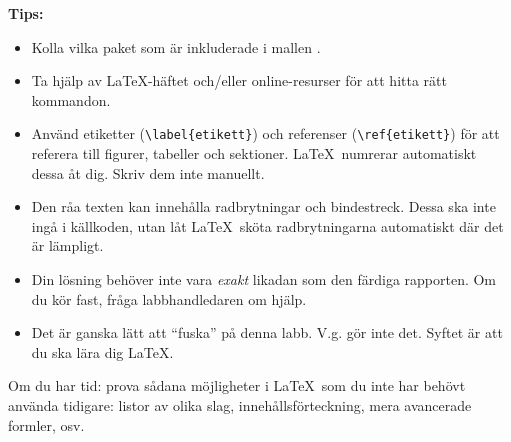 \begin{Datorarbete}
    \noindent\textbf{Tips:}
    \begin{itemize}
        \item Kolla vilka paket som är inkluderade i mallen .
        \item Ta hjälp av \LaTeX-häftet och/eller online-resurser för att hitta rätt kommandon.
        \item Använd etiketter (\verb/\label{etikett}/) och referenser (\verb/\ref{etikett}/) för att referera till figurer, tabeller och sektioner. \LaTeX\ numrerar automatiskt dessa åt dig. Skriv dem inte manuellt.
        \item Den råa texten kan innehålla radbrytningar och bindestreck. Dessa ska inte ingå i källkoden, utan låt \LaTeX\ sköta radbrytningarna automatiskt där det är lämpligt.
        \item Din lösning behöver inte vara \emph{exakt} likadan som den färdiga rapporten. Om du kör fast, fråga labbhandledaren om hjälp.
        \item Det är ganska lätt att \enquote{fuska} på denna labb. V.g. gör inte det. Syftet är att du ska lära dig \LaTeX.
    \end{itemize}

	\item Om du har tid: prova sådana möjligheter i \LaTeX\ som du inte har behövt använda tidigare: listor av olika slag, innehållsförteckning, mera avancerade formler, osv.
\end{Datorarbete}

